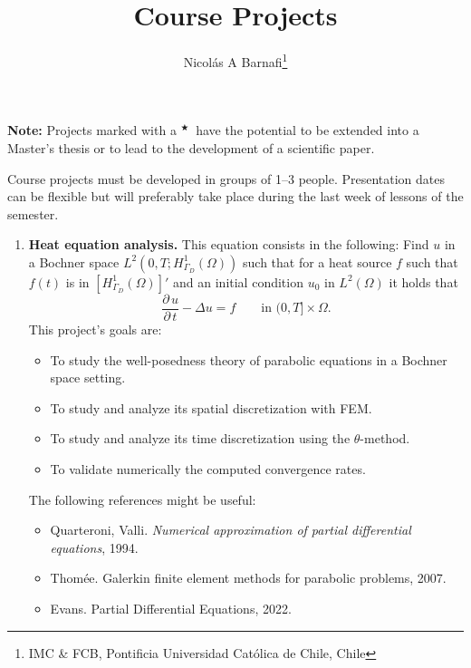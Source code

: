 \documentclass{article}
\title{Course Projects}
\author{Nicol\'as A Barnafi\thanks{IMC \& FCB, Pontificia Universidad Católica de Chile, Chile}}
\date{}
\newcommand{\parder}[2]{\frac{\partial\,#1}{\partial\,#2}}
\newcommand{\master}{$^\bigstar$}
\begin{document}
\maketitle

\noindent\textbf{Note:} Projects marked with a \master\ have the potential to be extended into a Master's thesis or to lead to the development of a scientific paper.

\vspace{0.5cm}

Course projects must be developed in groups of 1--3 people.
Presentation dates can be flexible but will preferably take place during the last week of lessons of the semester.
\begin{enumerate}
    \item \textbf{Heat equation analysis.} This equation consists in the following: Find $u$ in a Bochner space $L^2(0,T;H_{\Gamma_D}^1(\Omega))$ such that for a heat source $f$ such that $f(t)$ is in $[H_{\Gamma_D}^1(\Omega)]'$ and an initial condition $u_0$ in $L^2(\Omega)$ it holds that
        $$\parder{u}{t} - \Delta u = f \qquad\text{in $(0,T]\times \Omega$}.$$
        This project's goals are:
        \begin{itemize}
            \item To study the well-posedness theory of parabolic equations in a Bochner space setting.
            \item To study and analyze its spatial discretization with FEM.
            \item To study and analyze its time discretization using the $\theta$-method.
            \item To validate numerically the computed convergence rates.
        \end{itemize}

        The following references might be useful: 
        \begin{itemize}
            \item Quarteroni, Valli. \emph{Numerical approximation of partial differential equations}, 1994.
            \item Thomée. Galerkin finite element methods for parabolic problems, 2007.
            \item Evans. Partial Differential Equations, 2022.
        \end{itemize}


\end{enumerate}
\end{document}
